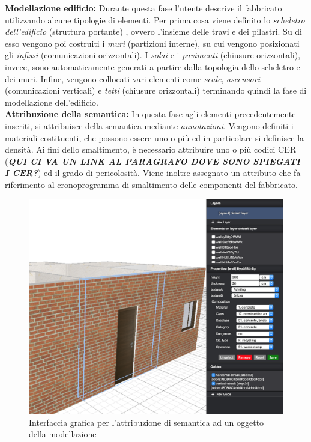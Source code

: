 \noindent \textbf{Modellazione edificio:} Durante questa fase l'utente descrive il fabbricato utilizzando alcune tipologie di elementi. Per prima cosa viene definito lo \textit{scheletro dell'edificio} (struttura portante) , ovvero l'insieme delle travi e dei pilastri. Su di esso vengono poi costruiti i \textit{muri} (partizioni interne), su cui vengono posizionati gli \textit{infissi} (comunicazioni orizzontali). I \textit{solai} e i \textit{pavimenti} (chiusure orizzontali), invece, sono automaticamente generati a partire dalla topologia dello scheletro e dei muri. Infine, vengono collocati vari elementi come \textit{scale}, \textit{ascensori} (comunicazioni verticali) e \textit{tetti} (chiusure orizzontali) terminando quindi la fase di modellazione dell'edificio.\\

\noindent \textbf{Attribuzione della semantica:} In questa fase agli elementi precedentemente inseriti, si attribuisce della semantica mediante \textit{annotazioni}. Vengono definiti i materiali costituenti, che possono essere uno o pi\`u ed in particolare si definisce la densit\`a. Ai fini dello smaltimento, \`e necessario attribuire uno o pi\`u codici CER (\textbf{\textit{QUI CI VA UN LINK AL PARAGRAFO DOVE SONO SPIEGATI I CER?}}) ed il grado di pericolosit\`a. Viene inoltre assegnato un attributo che fa riferimento al cronoprogramma di smaltimento delle componenti del fabbricato.\\

\begin{figure}[!h]
  \centering
  \includegraphics[width=1\linewidth]{images/3d-sel}
  \caption{Interfaccia grafica per l'attribuzione di semantica ad un oggetto della modellazione}
  \label{fig:semantics}
\end{figure}

